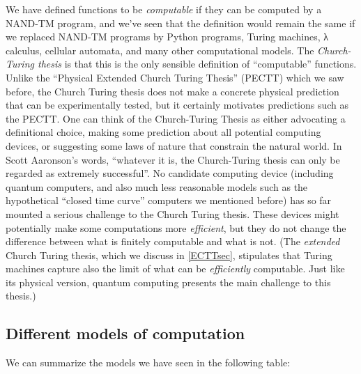 We have defined functions to be \emph{computable} if they can be
computed by a NAND-TM program, and we've seen that the definition would
remain the same if we replaced NAND-TM programs by Python programs,
Turing machines, λ calculus, cellular automata, and many other
computational models. The \emph{Church-Turing thesis} is that this is
the only sensible definition of ``computable'' functions. Unlike the
``Physical Extended Church Turing Thesis'' (PECTT) which we saw before,
the Church Turing thesis does not make a concrete physical prediction
that can be experimentally tested, but it certainly motivates
predictions such as the PECTT. One can think of the Church-Turing Thesis
as either advocating a definitional choice, making some prediction about
all potential computing devices, or suggesting some laws of nature that
constrain the natural world. In Scott Aaronson's words, ``whatever it
is, the Church-Turing thesis can only be regarded as extremely
successful''. No candidate computing device (including quantum
computers, and also much less reasonable models such as the hypothetical
``closed time curve'' computers we mentioned before) has so far mounted
a serious challenge to the Church Turing thesis. These devices might
potentially make some computations more \emph{efficient}, but they do
not change the difference between what is finitely computable and what
is not. (The \emph{extended} Church Turing thesis, which we discuss in
\cref{ECTTsec}, stipulates that Turing machines capture also the limit
of what can be \emph{efficiently} computable. Just like its physical
version, quantum computing presents the main challenge to this thesis.)

\subsection{Different models of
computation}\label{Different-models-of-compu}

We can summarize the models we have seen in the following table:

